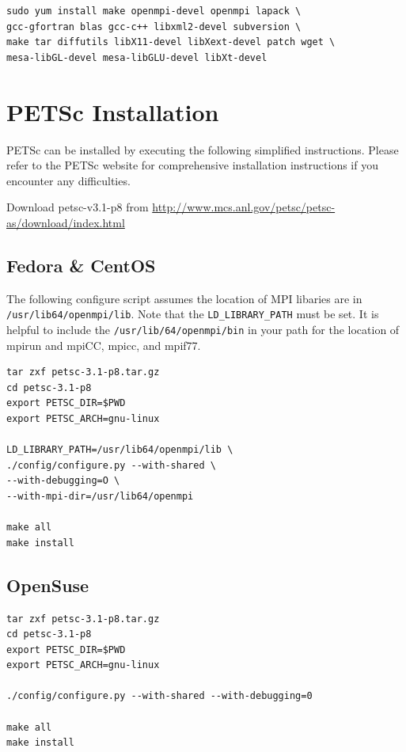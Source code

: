 \documentclass[12pt]{article}
\begin{document}
\begin{verbatim}
sudo yum install make openmpi-devel openmpi lapack \
gcc-gfortran blas gcc-c++ libxml2-devel subversion \ 
make tar diffutils libX11-devel libXext-devel patch wget \
mesa-libGL-devel mesa-libGLU-devel libXt-devel 
\end{verbatim} 


\section{PETSc Installation}

PETSc can be installed by executing the following simplified
instructions.  Please refer to the PETSc website for comprehensive
installation instructions if you encounter any difficulties.

Download petsc-v3.1-p8 from
\url{http://www.mcs.anl.gov/petsc/petsc-as/download/index.html}

\subsection{Fedora \& CentOS}

The following configure script assumes the location of MPI libaries
are in \texttt{/usr/lib64/openmpi/lib}.  Note that the
\texttt{LD\_LIBRARY\_PATH} must be set.  It is helpful to include the
\texttt{/usr/lib/64/openmpi/bin} in your path for the location of
mpirun and mpiCC, mpicc, and mpif77.

\begin{Verbatim}
tar zxf petsc-3.1-p8.tar.gz
cd petsc-3.1-p8
export PETSC_DIR=$PWD
export PETSC_ARCH=gnu-linux

LD_LIBRARY_PATH=/usr/lib64/openmpi/lib \
./config/configure.py --with-shared \
--with-debugging=O \
--with-mpi-dir=/usr/lib64/openmpi

make all
make install
\end{Verbatim}

\subsection{OpenSuse}

\begin{Verbatim}
tar zxf petsc-3.1-p8.tar.gz
cd petsc-3.1-p8
export PETSC_DIR=$PWD
export PETSC_ARCH=gnu-linux

./config/configure.py --with-shared --with-debugging=0 

make all
make install
\end{Verbatim}
\end{document}
